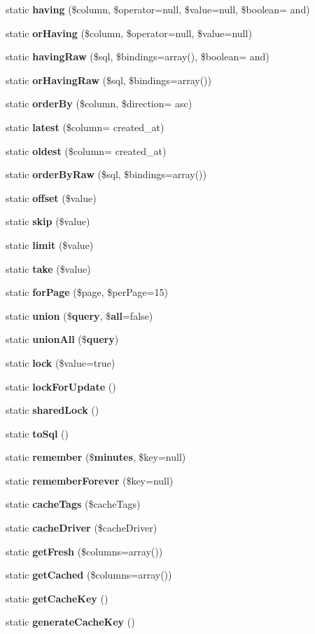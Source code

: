 \begin{DoxyCompactItemize}
static {\bf having} (\$column, \$operator=null, \$value=null, \$boolean= \textquotesingle{}and\textquotesingle{})
\item 
static {\bf or\+Having} (\$column, \$operator=null, \$value=null)
\item 
static {\bf having\+Raw} (\$sql, \$bindings=array(), \$boolean= \textquotesingle{}and\textquotesingle{})
\item 
static {\bf or\+Having\+Raw} (\$sql, \$bindings=array())
\item 
static {\bf order\+By} (\$column, \$direction= \textquotesingle{}asc\textquotesingle{})
\item 
static {\bf latest} (\$column= \textquotesingle{}created\+\_\+at\textquotesingle{})
\item 
static {\bf oldest} (\$column= \textquotesingle{}created\+\_\+at\textquotesingle{})
\item 
static {\bf order\+By\+Raw} (\$sql, \$bindings=array())
\item 
static {\bf offset} (\$value)
\item 
static {\bf skip} (\$value)
\item 
static {\bf limit} (\$value)
\item 
static {\bf take} (\$value)
\item 
static {\bf for\+Page} (\$page, \$per\+Page=15)
\item 
static {\bf union} (\${\bf query}, \${\bf all}=false)
\item 
static {\bf union\+All} (\${\bf query})
\item 
static {\bf lock} (\$value=true)
\item 
static {\bf lock\+For\+Update} ()
\item 
static {\bf shared\+Lock} ()
\item 
static {\bf to\+Sql} ()
\item 
static {\bf remember} (\${\bf minutes}, \$key=null)
\item 
static {\bf remember\+Forever} (\$key=null)
\item 
static {\bf cache\+Tags} (\$cache\+Tags)
\item 
static {\bf cache\+Driver} (\$cache\+Driver)
\item 
static {\bf get\+Fresh} (\$columns=array())
\item 
static {\bf get\+Cached} (\$columns=array())
\item 
static {\bf get\+Cache\+Key} ()
\item 
static {\bf generate\+Cache\+Key} ()
\item 

\end{DoxyCompactItemize}
